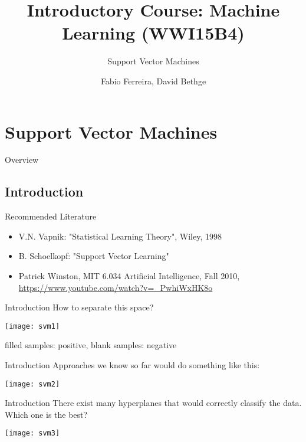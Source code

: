 \documentclass{beamer}
\title[]{Introductory Course: Machine Learning (WWI15B4)}
\subtitle{Support Vector Machines}
\author{Fabio Ferreira, David Bethge}
\institute{DHBW Karlsruhe}
\date{}
\begin{document}
%
%

\begin{frame}
  \titlepage
\end{frame}



\section{Support Vector Machines}
\begin{frame}{Overview}
\tableofcontents
\end{frame}

\subsection{Introduction}
\begin{frame}{Recommended Literature}
\begin{itemize}
\item V.N. Vapnik: "Statistical Learning Theory", Wiley, 1998
\item B. Schoelkopf: "Support Vector Learning"
\item Patrick Winston, MIT 6.034 Artificial Intelligence, Fall 2010, \url{https://www.youtube.com/watch?v=_PwhiWxHK8o}
\end{itemize}
\end{frame}

\begin{frame}{Introduction}
How to separate this space?
\begin{center}
\texttt{[image: svm1]}
\end{center}
filled samples: positive, blank samples: negative
\end{frame}

\begin{frame}{Introduction}
Approaches we know so far would do something like this:
\begin{center}
\texttt{[image: svm2]}
\end{center}
\end{frame}

\begin{frame}{Introduction}
There exist many hyperplanes that would correctly classify the data. Which one is the best?
\begin{center}
\texttt{[image: svm3]}
\end{center}
\end{frame}
\end{document}
